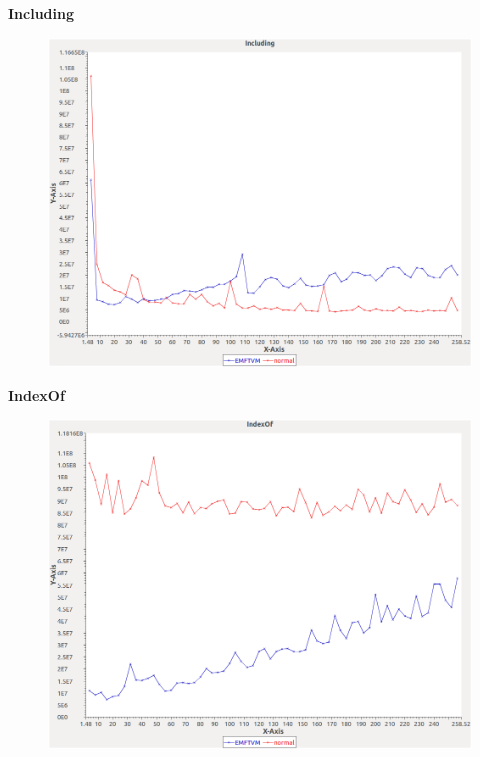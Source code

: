\noindent\textbf{Including}

\begin{figure}[h]
\centering
\includegraphics[width=\textwidth]{../graphs/sequence/Including}
\end{figure}
\pagebreak

\noindent\textbf{IndexOf}

\begin{figure}[h]
\centering
\includegraphics[width=\textwidth]{../graphs/sequence/IndexOf}
\end{figure}
\pagebreak

